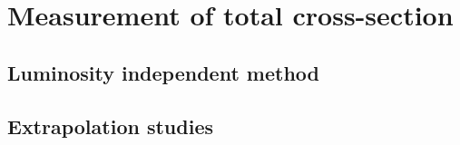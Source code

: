 \chapter{Measurement of total cross-section}

\section{Luminosity independent method}

\section{Extrapolation studies}


